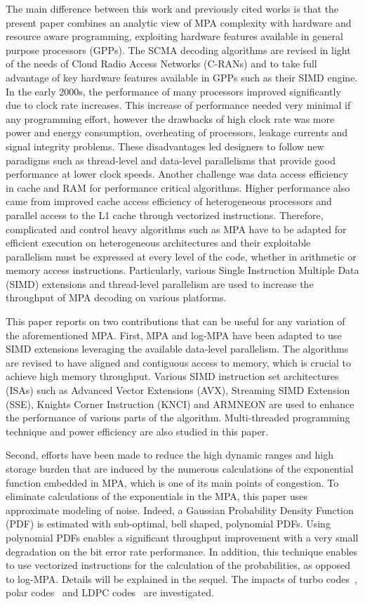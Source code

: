 The main difference between this work and previously cited works is that the
present paper combines an analytic view of MPA complexity with hardware and
resource aware programming, exploiting hardware features available in general
purpose processors (GPPs). The SCMA decoding algorithms are revised in light of
the needs of Cloud Radio Access Networks (C-RANs) and to take full advantage of
key hardware features available in GPPs such as their SIMD engine. In the early
2000s, the performance of many processors improved significantly due to clock
rate increases. This increase of performance needed very minimal if any
programming effort, however the drawbacks of high clock rate was more power and
energy consumption, overheating of processors, leakage currents and signal
integrity problems. These disadvantages led designers to follow new paradigms
such as thread-level and data-level parallelisms that provide good performance
at lower clock speeds. Another challenge was data access efficiency in cache and
RAM for performance critical algorithms. Higher performance also came from
improved cache access efficiency of heterogeneous processors and parallel access
to the L1 cache through vectorized instructions. Therefore, complicated and
control heavy algorithms such as MPA have to be adapted for efficient execution
on heterogeneous architectures and their exploitable parallelism must be
expressed at every level of the code, whether in arithmetic or memory access
instructions. Particularly, various Single Instruction Multiple Data (SIMD)
extensions and thread-level parallelism are used to increase the throughput of
MPA decoding on various platforms.

This paper reports on two contributions that can be useful for any variation of
the aforementioned MPA. First, MPA and log-MPA have been adapted to use SIMD
extensions leveraging the available data-level parallelism. The algorithms are
revised to have aligned and contiguous access to memory, which is crucial to
achieve high memory throughput. Various SIMD instruction set architectures
(ISAs) such as Advanced Vector Extensions (AVX), Streaming SIMD Extension (SSE),
Knights Corner Instruction (KNCI) and ARM\R NEON are used to enhance the
performance of various parts of the algorithm. Multi-threaded programming
technique and power efficiency are also studied in this paper.

Second, efforts have been made to reduce the high dynamic ranges and high
storage burden that are induced by the numerous calculations of the exponential
function embedded in MPA, which is one of its main points of congestion. To
eliminate calculations of the exponentials in the MPA, this paper uses
approximate modeling of noise. Indeed, a Gaussian Probability Density Function
(PDF) is estimated with sub-optimal, bell shaped, polynomial PDFs. Using
polynomial PDFs enables a significant throughput improvement with a very small
degradation on the bit error rate performance. In addition, this technique
enables to use vectorized instructions for the calculation of the probabilities,
as opposed to log-MPA. Details will be explained in the sequel. The impacts of
turbo codes~\cite{Berrou1993}, polar codes~\cite{Arikan2009} and LDPC
codes~\cite{Gallager1962,MacKay1995} are investigated.


